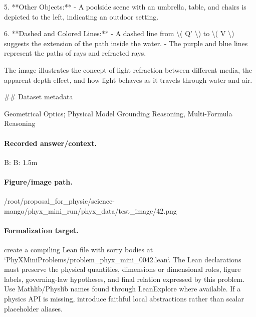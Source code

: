 5. **Other Objects:**
   - A poolside scene with an umbrella, table, and chairs is depicted to the left, indicating an outdoor setting.

6. **Dashed and Colored Lines:**
   - A dashed line from \textbackslash{}( Q' \textbackslash{}) to \textbackslash{}( V \textbackslash{}) suggests the extension of the path inside the water.
   - The purple and blue lines represent the paths of rays and refracted rays.

The image illustrates the concept of light refraction between different media, the apparent depth effect, and how light behaves as it travels through water and air.

\#\# Dataset metadata

Geometrical Optics; Physical Model Grounding Reasoning, Multi-Formula Reasoning

\paragraph{Recorded answer/context.}
B: B: 1.5m

\paragraph{Figure/image path.}
/root/proposal\_for\_physic/science-mango/phyx\_mini\_run/phyx\_data/test\_image/42.png

\paragraph{Formalization target.}
create a compiling Lean file with sorry bodies at `PhyXMiniProblems/problem\_phyx\_mini\_0042.lean`. The Lean declarations must preserve the physical quantities, dimensions or dimensional roles, figure labels, governing-law hypotheses, and final relation expressed by this problem.
Use Mathlib/Physlib names found through LeanExplore where available. If a physics API is missing, introduce faithful local abstractions rather than scalar placeholder aliases.

